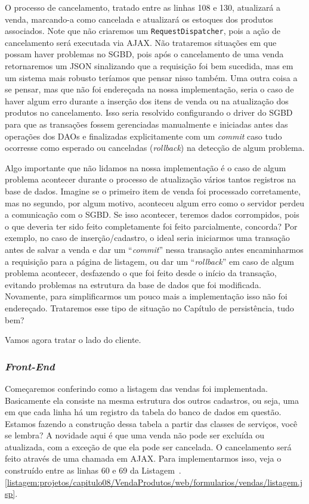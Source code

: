 O processo de cancelamento, tratado entre as linhas 108 e 130, atualizará a venda, marcando-a como cancelada e atualizará os estoques dos produtos associados. Note que não criaremos um \texttt{RequestDispatcher}, pois a ação de cancelamento será executada via AJAX. Não trataremos situações em que possam haver problemas no SGBD, pois após o cancelamento de uma venda retornaremos um JSON sinalizando que a requisição foi bem sucedida, mas em um sistema mais robusto teríamos que pensar nisso também. Uma outra coisa a se pensar, mas que não foi endereçada na nossa implementação, seria o caso de haver algum erro durante a inserção dos itens de venda ou na atualização dos produtos no cancelamento. Isso seria resolvido configurando o driver do SGBD para que as transações fossem gerenciadas manualmente e iniciadas antes das operações dos DAOs e finalizadas explicitamente com um \textit{commit} caso tudo ocorresse como esperado ou canceladas (\textit{rollback}) na detecção de algum problema.

Algo importante que não lidamos na nossa implementação é o caso de algum problema acontecer durante o processo de atualização vários tantos registros na base de dados. Imagine se o primeiro item de venda foi processado corretamente, mas no segundo, por algum motivo, aconteceu algum erro como o servidor perdeu a comunicação com o SGBD. Se isso acontecer, teremos dados corrompidos, pois o que deveria ter sido feito completamente foi feito parcialmente, concorda? Por exemplo, no caso de inserção/cadastro, o ideal seria iniciarmos uma transação antes de salvar a venda e dar um ``\textit{commit}'' nessa transação antes encaminharmos a requisição para a página de listagem, ou dar um ``\textit{rollback}'' em caso de algum problema acontecer, desfazendo o que foi feito desde o início da transação, evitando problemas na estrutura da base de dados que foi modificada. Novamente, para simplificarmos um pouco mais a implementação isso não foi endereçado. Trataremos esse tipo de situação no Capítulo de persistência, tudo bem?

Vamos agora tratar o lado do cliente.


\subsubsection{\textit{Front-End}}

Começaremos conferindo como a listagem das vendas foi implementada. Basicamente ela consiste na mesma estrutura dos outros cadastros, ou seja, uma  em que cada linha há um registro da tabela do banco de dados em questão. Estamos fazendo a construção dessa tabela a partir das classes de serviços, você se lembra? A novidade aqui é que uma venda não pode ser excluída ou atualizada, com a exceção de que ela pode ser cancelada. O cancelamento será feito através de uma chamada em AJAX. Para implementarmos isso, veja o  construído entre as linhas 60 e 69 da Listagem~\thechapter.\ref{listagem:projetos/capitulo08/VendaProdutos/web/formularios/vendas/listagem.jsp}.

